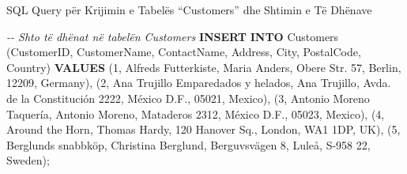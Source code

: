 \documentclass[
  ignorenonframetext,
]{beamer}
\newenvironment{Shaded}{\begin{snugshade}}{\end{snugshade}}
\newcommand{\CommentTok}[1]{\textcolor[rgb]{0.56,0.35,0.01}{\textit{#1}}}
\newcommand{\DecValTok}[1]{\textcolor[rgb]{0.00,0.00,0.81}{#1}}
\newcommand{\KeywordTok}[1]{\textcolor[rgb]{0.13,0.29,0.53}{\textbf{#1}}}
\newcommand{\NormalTok}[1]{#1}
\newcommand{\StringTok}[1]{\textcolor[rgb]{0.31,0.60,0.02}{#1}}
\begin{document}
\begin{frame}[fragile]{SQL Query për Krijimin e Tabelës ``Customers''
dhe Shtimin e Të Dhënave}
\label{sql-query-puxebr-krijimin-e-tabeluxebs-customers-dhe-shtimin-e-tuxeb-dhuxebnave-1}

\begin{Shaded}
\begin{Highlighting}[]
\CommentTok{{-}{-} Shto të dhënat në tabelën Customers}
\KeywordTok{INSERT} \KeywordTok{INTO}\NormalTok{ Customers (CustomerID, CustomerName, ContactName, Address, City, PostalCode, Country) }\KeywordTok{VALUES}
\NormalTok{(}\DecValTok{1}\NormalTok{, }\StringTok{\textquotesingle{}Alfreds Futterkiste\textquotesingle{}}\NormalTok{, }\StringTok{\textquotesingle{}Maria Anders\textquotesingle{}}\NormalTok{, }\StringTok{\textquotesingle{}Obere Str. 57\textquotesingle{}}\NormalTok{, }\StringTok{\textquotesingle{}Berlin\textquotesingle{}}\NormalTok{, }\StringTok{\textquotesingle{}12209\textquotesingle{}}\NormalTok{, }\StringTok{\textquotesingle{}Germany\textquotesingle{}}\NormalTok{),}
\NormalTok{(}\DecValTok{2}\NormalTok{, }\StringTok{\textquotesingle{}Ana Trujillo Emparedados y helados\textquotesingle{}}\NormalTok{, }\StringTok{\textquotesingle{}Ana Trujillo\textquotesingle{}}\NormalTok{, }\StringTok{\textquotesingle{}Avda. de la Constitución 2222\textquotesingle{}}\NormalTok{, }\StringTok{\textquotesingle{}México D.F.\textquotesingle{}}\NormalTok{, }\StringTok{\textquotesingle{}05021\textquotesingle{}}\NormalTok{, }\StringTok{\textquotesingle{}Mexico\textquotesingle{}}\NormalTok{),}
\NormalTok{(}\DecValTok{3}\NormalTok{, }\StringTok{\textquotesingle{}Antonio Moreno Taquería\textquotesingle{}}\NormalTok{, }\StringTok{\textquotesingle{}Antonio Moreno\textquotesingle{}}\NormalTok{, }\StringTok{\textquotesingle{}Mataderos 2312\textquotesingle{}}\NormalTok{, }\StringTok{\textquotesingle{}México D.F.\textquotesingle{}}\NormalTok{, }\StringTok{\textquotesingle{}05023\textquotesingle{}}\NormalTok{, }\StringTok{\textquotesingle{}Mexico\textquotesingle{}}\NormalTok{),}
\NormalTok{(}\DecValTok{4}\NormalTok{, }\StringTok{\textquotesingle{}Around the Horn\textquotesingle{}}\NormalTok{, }\StringTok{\textquotesingle{}Thomas Hardy\textquotesingle{}}\NormalTok{, }\StringTok{\textquotesingle{}120 Hanover Sq.\textquotesingle{}}\NormalTok{, }\StringTok{\textquotesingle{}London\textquotesingle{}}\NormalTok{, }\StringTok{\textquotesingle{}WA1 1DP\textquotesingle{}}\NormalTok{, }\StringTok{\textquotesingle{}UK\textquotesingle{}}\NormalTok{),}
\NormalTok{(}\DecValTok{5}\NormalTok{, }\StringTok{\textquotesingle{}Berglunds snabbköp\textquotesingle{}}\NormalTok{, }\StringTok{\textquotesingle{}Christina Berglund\textquotesingle{}}\NormalTok{, }\StringTok{\textquotesingle{}Berguvsvägen 8\textquotesingle{}}\NormalTok{, }\StringTok{\textquotesingle{}Luleå\textquotesingle{}}\NormalTok{, }\StringTok{\textquotesingle{}S{-}958 22\textquotesingle{}}\NormalTok{, }\StringTok{\textquotesingle{}Sweden\textquotesingle{}}\NormalTok{);}
\end{Highlighting}
\end{Shaded}
\end{frame}
\end{document}
